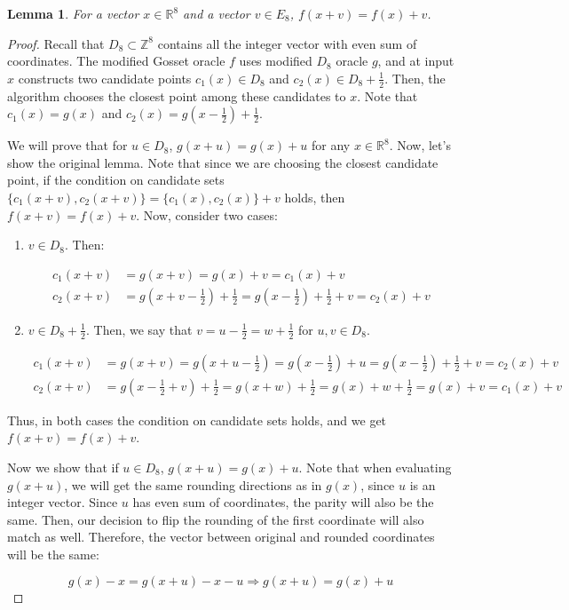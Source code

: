 \documentclass{article}
\theoremstyle{plain}
\newtheorem{lemma}[theorem]{Lemma}
\theoremstyle{definition}
\theoremstyle{remark}
\begin{document}
\begin{lemma}
    For a vector $x \in \mathbb{R}^8$ and a vector $v \in E_8$, $f(x + v) = f(x) + v$.
    \label{lemma:nestquantm}
\end{lemma}

\begin{proof}
    Recall that $D_8 \subset \mathbb{Z}^8$ contains all the integer vector with even sum of coordinates. The modified Gosset oracle $f$ uses modified $D_8$ oracle $g$, and at input $x$ constructs two candidate points $c_1(x) \in D_8$ and $c_2(x) \in D_8 + \frac{1}{2}$. Then, the algorithm chooses the closest point among these candidates to $x$. Note that $c_1(x) = g(x)$ and $c_2(x) = g\left(x - \frac{1}{2}\right) + \frac{1}{2}$.

    We will prove that for $u \in D_8$, $g(x + u) = g(x) + u$ for any $x \in \mathbb{R}^8$. Now, let's show the original lemma. Note that since we are choosing the closest candidate point, if the condition on candidate sets $\{c_1(x + v), c_2(x + v)\} = \{c_1(x), c_2(x)\} + v$ holds, then $f(x+v) = f(x) + v$. Now, consider two cases:

    \begin{enumerate}
        \item $v \in D_8$. Then:

        \begin{align*}
            c_1(x + v) &= g(x + v) = g(x) + v = c_1(x) + v \\
            c_2(x + v) &= g\left(x+v-\frac{1}{2}\right) + \frac{1}{2} =
            g\left(x-\frac{1}{2}\right)+\frac{1}{2}+v =
            c_2(x) + v
        \end{align*}

        \item $v \in D_8+\frac{1}{2}$. Then, we say that $v = u - \frac{1}{2} = w + \frac{1}{2}$ for $u, v \in D_8$.

        \begin{align*}
            c_1(x + v) &= g(x + v) = g\left(x + u - \frac{1}{2}\right) = g\left(x - \frac{1}{2}\right) + u
            = g\left(x - \frac{1}{2}\right) + \frac{1}{2} + v =
            c_2(x) + v \\
            c_2(x + v) &= g\left(x - \frac{1}{2} + v\right) + \frac{1}{2} = g(x + w) + \frac{1}{2} = g(x) + w + \frac{1}{2} = g(x) + v = c_1(x) + v
        \end{align*}
    \end{enumerate}

    Thus, in both cases the condition on candidate sets holds, and we get $f(x + v) = f(x) + v$.

    Now we show that if $u \in D_8$, $g(x + u) = g(x) + u$. Note that when evaluating $g(x + u)$, we will get the same rounding directions as in $g(x)$, since $u$ is an integer vector. Since $u$ has even sum of coordinates, the parity will also be the same. Then, our decision to flip the rounding of the first coordinate will also match as well. Therefore, the vector between original and rounded coordinates will be the same:

    \[
        g(x) - x = g(x + u) - x - u \Rightarrow g(x + u) = g(x) + u
    \]
\end{proof}
\end{document}
